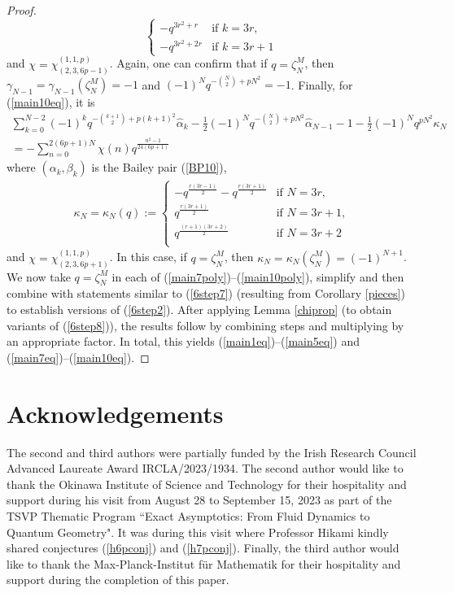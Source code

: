 \documentclass[11pt,reqno]{amsart}
\theoremstyle{definition}
\numberwithin{equation}{section}
\renewcommand{\=}{\;=\;}
\begin{document}
\begin{proof}
$$\begin{cases}
     -q^{3r^2+r}               &\text{if $k=3r$},\\
    -q^{3r^2+2r}              &\text{if $k=3r+1$}
\end{cases}
$$
and $\chi=\chi_{(2,3,6p-1)}^{(1,1,p)}$. Again, one can confirm that if $q=\zeta_N^{M}$, then $\gamma_{N-1} =\gamma_{N-1}(\zeta_N^M)= -1$ and $(-1)^N q^{-\binom{N}{2} + pN^2} = -1$. Finally, for (\ref{main10eq}), it is
\begin{equation} \label{main10poly}
\begin{aligned}
  \sum_{k=0}^{N-2}(-1)^k
  q^{-\binom{k+1}{2}+p(k+1)^2}\widehat{\alpha}_k
    -\frac 1 2(-1)^Nq^{-\binom N2+pN^2}\widehat{\alpha}_{N-1} -1
    -\frac{1}{2} (-1)^N q^{pN^2} \kappa_N \\ 
  =-\sum_{n=0}^{2(6p+1)N} \chi(n) q^{\frac{n^2-1}{24(6p+1)}}
 \end{aligned}\end{equation}
 where $(\alpha_k, \beta_k)$ is the Bailey pair (\ref{BP10}),
\begin{align*}
  \kappa_N = \kappa_N(q) := \begin{cases}
   -q^{\frac{r(3r-1)}{2}}-q^{\frac{r(3r+1)}{2}} &\text{if $N = 3r$,}\\
   q^{\frac{r(3r+1)}{2}} &\text{if $N= 3r+1$,}\\
   q^{\frac{(r+1)(3r+2)}{2}} &\text{if $N =3r+2$}\\
    \end{cases}
\end{align*}
and $\chi=\chi_{(2,3,6p+1)}^{(1,1,p)}$. In this case, if $q=\zeta_N^{M}$, then $\kappa_N = \kappa_N(\zeta_N^M) = (-1)^{N+1}$. We now take $q=\zeta_N^{M}$ in each of (\ref{main7poly})--(\ref{main10poly}), simplify and then combine with statements similar to (\ref{6step7}) (resulting from Corollary \ref{pieces}) to establish versions of (\ref{6step2}). After applying Lemma \ref{chiprop} (to obtain variants of (\ref{6step8})), the results follow by combining steps and multiplying by an appropriate factor. In total, this yields (\ref{main1eq})--(\ref{main5eq}) and (\ref{main7eq})--(\ref{main10eq}). 
\end{proof}

\section*{Acknowledgements}
The second and third authors were partially funded by the Irish Research Council Advanced Laureate Award IRCLA/2023/1934. The second author would like to thank the Okinawa Institute of Science and Technology for their hospitality and support during his visit from August 28 to September 15, 2023 as part of the TSVP Thematic Program ``Exact Asymptotics: From Fluid Dynamics to Quantum Geometry". It was during this visit where Professor Hikami kindly shared conjectures (\ref{h6pconj}) and (\ref{h7pconj}). Finally, the third author would like to thank the Max-Planck-Institut f{\"u}r Mathematik for their hospitality and support during the completion of this paper.
\end{document}
